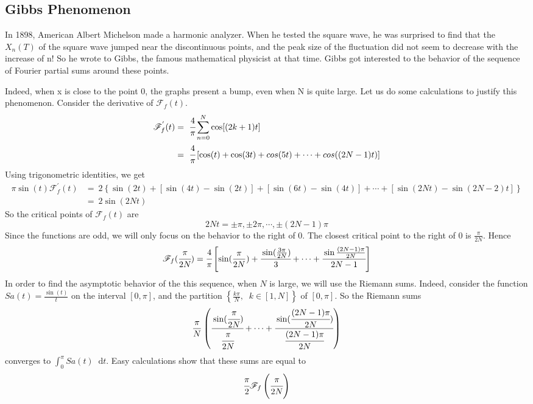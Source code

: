 \documentclass[margin,line]{res}
\newcommand*{\dif}{\mathop{}\!\mathrm{d}}
\begin{document}
\begin{resume}
\subsection{\textbf{Gibbs Phenomenon}}
In 1898, American Albert Michelson made a harmonic analyzer. When he tested the square wave, he was surprised to find that the $X_n(T)$ of the square wave jumped near the discontinuous points, and the peak size of the fluctuation did not seem to decrease with the increase of n! So he wrote to Gibbs, the famous mathematical physicist at that time. Gibbs got interested to the behavior of the sequence of Fourier partial sums around these points. \par
Indeed, when x is close to the point 0, the graphs present a bump, even when N is quite large. Let us do some calculations to justify this phenomenon. Consider the derivative of $\mathscr{F}_f(t)$.
\begin{align}
\mathscr{F}^{'}_f(t) 
	&= \ \cfrac{4}{\pi} \sum\limits_{n=0}^N{\cos [(2k+1)t]} \nonumber \\
	&= \ \cfrac{4}{\pi} \left[ \cos(t) + \cos(3t) + cos(5t) + \cdots + cos((2N-1)t) \right] \nonumber 
\end{align}
Using trigonometric identities, we get 
\begin{align}
\pi\sin(t) \mathscr{F}^{'}_f(t) 
	&= \ 2\left\{ \sin(2t) + \left[\sin(4t)-\sin(2t)\right] + \left[\sin(6t)-\sin(4t)\right] + \cdots + \left[ \sin(2Nt)-\sin(2N-2)t \right] \right\} \nonumber \\
	&= \ 2\sin(2Nt) \nonumber
\end{align}
So the critical points of $\mathscr{F}_f(t)$ are 
$$
2Nt = \pm\pi , \pm 2\pi,\cdots,\pm (2N-1)\pi
$$
Since the functions are odd, we will only focus on the behavior to the right of 0. The closest critical point to the right of 0 is $\frac{\pi}{2N}$. Hence 
$$
\mathscr{F}_f(\cfrac{\pi}{2N}) = \cfrac{4}{\pi} \left[{
	\sin(\frac{\pi}{2N}) + \cfrac{\sin(\frac{3\pi}{2N})}{3} + \cdots +
	\cfrac{\sin\frac{(2N-1)\pi}{2N}}{2N-1}
}\right]
$$
In order to find the asymptotic behavior of the this sequence, when $N$ is large, we will use the Riemann sums. Indeed, consider the function $Sa(t) = \frac{\sin(t)}{t}$ on the interval $[0,\pi]$, and the partition $\left\{{\frac{k\pi}{N}}, \;\;k \in [1,N]\right\}$ of $[0,\pi]$. So the Riemann sums
$$
\frac{\pi}{N}
\left(
	\cfrac{\sin(\cfrac{\pi}{2N})}{\cfrac{\pi}{2N}} + \cdots +
	\cfrac{\sin(\cfrac{(2N-1)\pi}{2N})}{\cfrac{(2N-1)\pi}{2N}}
\right)
$$
converges to $\int_{0}^{\pi} Sa(t) \dif t$. Easy calculations show that these sums are equal to 
$$
\cfrac{\pi}{2}{\mathscr{F}_f \left( \cfrac{\pi}{2N} \right) }
$$


\end{resume}
\end{document}
